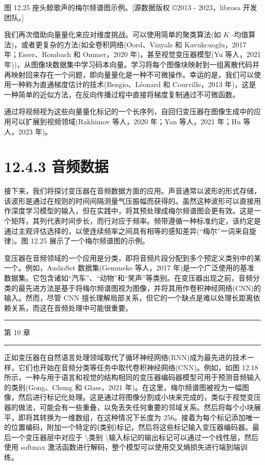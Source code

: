 \documentclass[10pt]{report}
\newcommand{\HRule}{\begin{center}\rule{0.9\linewidth}{0.2mm}\end{center}}
\begin{document}
图 12.25 座头鲸歌声的梅尔频谱图示例。[源数据版权 ©2013 - 2023，librosa 开发团队。]

我们再次借助向量量化来应对维度挑战。可以使用简单的聚类算法(如 \(K\) -均值算法)，或者更复杂的方法(如全卷积网络(Oord、Vinyals 和 Kavukcuoglu，2017 年；Esser、Rombach 和 Ommer，2020 年)，甚至视觉变压器模型(Yu 等人，2021 年))，从图像块数据集中学习码本向量。学习将每个图像块映射到一组离散代码并再映射回来存在一个问题，即向量量化是一种不可微操作。幸运的是，我们可以使用一种称为直通梯度估计的技术(Bengio、Léonard 和 Courville，2013 年)，这是一种简单的近似方法，在反向传播过程中直接将梯度复制通过不可微函数。

通过将视频视为这些向量量化标记的一个长序列，自回归变压器在图像生成中的应用可以扩展到视频领域(Rakhimov 等人，2020 年；Yan 等人，2021 年；Hu 等人，2023 年)。

\section*{12.4.3 音频数据}

接下来，我们将探讨变压器在音频数据方面的应用。声音通常以波形的形式存储，该波形是通过在规则的时间间隔测量气压振幅而获得的。虽然这种波形可以直接用作深度学习模型的输入，但在实践中，将其预处理成梅尔频谱图会更有效。这是一个矩阵，其列代表时间步长，而行对应于频率。频带遵循一种标准约定，该约定是通过主观评估选择的，以使连续频率之间具有相等的感知差异(“梅尔”一词来自旋律)。图 12.25 展示了一个梅尔频谱图的示例。

变压器在音频领域的一个应用是分类，即将音频片段分配到多个预定义类别中的某一个。例如，AudioSet 数据集(Gemmeke 等人，2017 年)是一个广泛使用的基准数据集。它包含诸如“汽车”、“动物”和“笑声”等类别。在变压器出现之前，音频分类的最先进方法是基于将梅尔频谱图视为图像，并将其用作卷积神经网络(CNN)的输入。然而，尽管 CNN 擅长理解局部关系，但它的一个缺点是难以处理长距离依赖关系，而这在音频处理中可能很重要。

\HRule

第 10 章

\HRule

正如变压器在自然语言处理领域取代了循环神经网络(RNN)成为最先进的技术一样，它们也开始在音频分类等任务中取代卷积神经网络(CNN)。例如，如图 12.18 所示，一种与用于语言和视觉的结构相同的变压器编码器模型可用于预测音频输入的类别(Gong、Chung 和 Glass，2021 年)。在这里，梅尔频谱图被视为一幅图像，然后进行标记化处理。这是通过将图像分割成小块来完成的，类似于视觉变压器的做法，可能会有一些重叠，以免丢失任何重要的邻域关系。然后将每个小块展平，即将其转换为一维数组，在这种情况下长度为 256。接着为每个标记添加唯一的位置编码，附加一个特定的⟨类别⟩标记，然后将这些标记输入变压器编码器。最后一个变压器层中对应于 \textbackslash 类别 \textbackslash 输入标记的输出标记可以通过一个线性层，然后使用 softmax 激活函数进行解码，整个模型可以使用交叉熵损失进行端到端训练。
\end{document}

